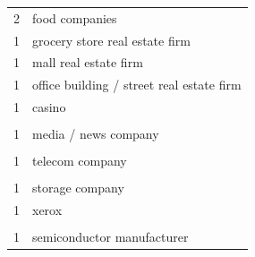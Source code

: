 \documentclass[final]{article}
\begin{document}
\begin{table}[H]
\begin{tabular}{@{}cl@{}}
  2 & food companies \\
  1 & grocery store real estate firm \\
  1 & mall real estate firm \\
  1 & office building / street real estate firm \\
  1 & casino \\
        & \\
  1 & media / news company \\
        & \\
  1 & telecom company \\
        & \\
  1 & storage company \\
  1 & xerox \\
        & \\
  1 & semiconductor manufacturer\\
  \bottomrule
\end{tabular}
\end{table}
\end{document}
